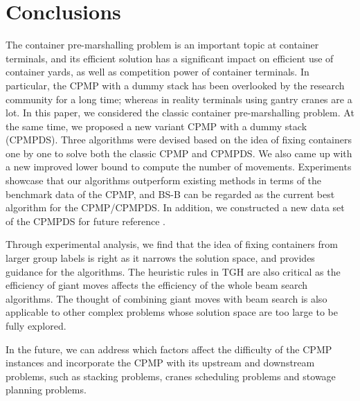\documentclass[review,3p,times,authoryear,12pt]{elsarticle}
\begin{document}
\section{Conclusions}
\label{sec:con}
The container pre-marshalling problem is an important topic at container terminals, and its efficient solution has a significant impact on efficient use of container yards, as well as competition power of container terminals. In particular, the CPMP with a dummy stack has been overlooked by the research community for a long time; whereas in reality terminals using gantry cranes are a lot.
In this paper, we considered the classic container pre-marshalling problem. At the same time, we proposed a new variant CPMP with a dummy stack (CPMPDS). Three algorithms were devised based on the idea of fixing containers one by one to solve both the classic CPMP and CPMPDS. We also came up with a new improved lower bound to compute the number of movements. Experiments showcase that our algorithms outperform existing methods in terms of the benchmark data of the CPMP, and BS-B can be regarded as the current best algorithm for the CPMP/CPMPDS.
In addition, we constructed a new data set of the CPMPDS for future reference .

Through experimental analysis, we find that the idea of fixing containers from larger group labels is right as it narrows the solution space, and provides guidance for the algorithms. The heuristic rules in TGH are also critical as the efficiency of giant moves affects the efficiency of the whole beam search algorithms. The thought of combining giant moves with beam search is also applicable to other complex problems whose solution space are too large to be fully explored.

In the future, we can address which factors affect the difficulty of the CPMP instances and incorporate the CPMP with its upstream and downstream problems, such as stacking problems, cranes scheduling problems and stowage planning problems.






\end{document}
